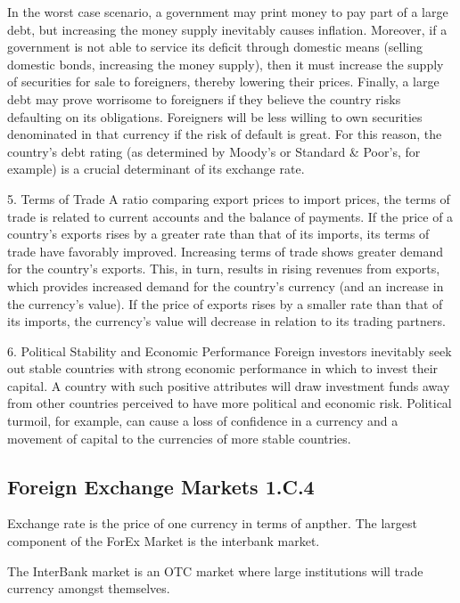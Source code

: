 In the worst case scenario, a government may print money to pay part of a large debt, but increasing the money supply inevitably causes inflation. Moreover, if a government is not able to service its deficit through domestic means (selling domestic bonds, increasing the money supply), then it must increase the supply of securities for sale to foreigners, thereby lowering their prices. Finally, a large debt may prove worrisome to foreigners if they believe the country risks defaulting on its obligations. Foreigners will be less willing to own securities denominated in that currency if the risk of default is great. For this reason, the country's debt rating (as determined by Moody's or Standard & Poor's, for example) is a crucial determinant of its exchange rate. 

5. Terms of Trade
A ratio comparing export prices to import prices, the terms of trade is related to current accounts and the balance of payments. If the price of a country's exports rises by a greater rate than that of its imports, its terms of trade have favorably improved. Increasing terms of trade shows greater demand for the country's exports. This, in turn, results in rising revenues from exports, which provides increased demand for the country's currency (and an increase in the currency's value). If the price of exports rises by a smaller rate than that of its imports, the currency's value will decrease in relation to its trading partners.

6. Political Stability and Economic Performance
Foreign investors inevitably seek out stable countries with strong economic performance in which to invest their capital. A country with such positive attributes will draw investment funds away from other countries perceived to have more political and economic risk. Political turmoil, for example, can cause a loss of confidence in a currency and a movement of capital to the currencies of more stable countries. 


\subsection*{Foreign Exchange Markets 1.C.4}

Exchange rate is the price of one currency in terms of anpther. The largest component of the ForEx Market is the interbank market.

The InterBank market is an OTC market where large institutions will trade currency amongst themselves.

